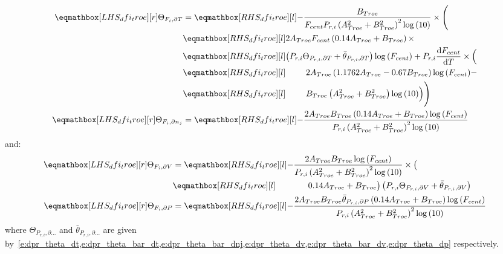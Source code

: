 \documentclass[12pt]{article}
\begin{document}
\begin{align}
\label{e:dfi_troe_dt_prod}
\lhs{dfi_troe}{\Theta_{F_i, \partial T}} &= 
\rhs{dfi_troe}{ - \frac{B_{Troe}}{F_{cent} P_{r, i} \left(A_{Troe}^{2} + B_{Troe}^{2}\right)^{2} \log{\left (10 \right )}} \times \Biggl(} \nonumber \\
&\rhs{dfi_troe}{ 2 A_{Troe} F_{cent} \left(0.14 A_{Troe} + B_{Troe}\right) \times } \nonumber \\
&\rhs{dfi_troe}{\left( P_{r, i} \Theta_{P_{r,i}, \partial T} + \bar{\theta}_{P_{r, i}, \partial T}\right) \log{\left (F_{cent} \right )} + P_{r, i} \frac{\text{d} F_{cent} }{\text{d} T } \times \Bigl(} \nonumber \\
&\rhs{dfi_troe}{\mathindent 2 A_{Troe} \left(1.1762 A_{Troe} - 0.67 B_{Troe}\right) \log{\left (F_{cent} \right )} - } \nonumber \\
&\rhs{dfi_troe}{\mathindent B_{Troe} \left(A_{Troe}^{2} + B_{Troe}^{2}\right) \log{\left (10 \right )}\Bigr)\Biggr)} \\
\label{e:dfi_troe_dnj_prod}
\lhs{dfi_troe}{\Theta_{F_i, \partial n_j}} &= \rhs{dfi_troe}{- \frac{2 A_{Troe} B_{Troe} \left(0.14 A_{Troe} + B_{Troe}\right) \log{\left (F_{cent} \right )}}{P_{r, i} \left(A_{Troe}^{2} + B_{Troe}^{2}\right)^{2} \log{\left (10 \right )}}}
\end{align}
and:
\begin{subequations}
 \label{e:dfi_troe_de_prod}
 \begin{align}
   \lhs{dfi_troe}{\Theta_{F_i, \partial V}} &= \rhs{dfi_troe}{- \frac{2 A_{Troe} B_{Troe} \log{\left (F_{cent} \right )}}{P_{r, i} \left(A_{Troe}^{2} + B_{Troe}^{2}\right)^{2} \log{\left (10 \right )}} \times \bigl(} \nonumber \\
					    & \rhs{dfi_troe}{\mathindent[alittlebit] 0.14 A_{Troe} + B_{Troe}\bigr) \left(P_{r, i} \Theta_{P_{r,i}, \partial V} + \bar{\theta}_{P_{r, i}, \partial V}\right)} \\
   \lhs{dfi_troe}{\Theta_{F_i, \partial P}} &= \rhs{dfi_troe}{- \frac{2 A_{Troe} B_{Troe} \bar{\theta}_{P_{r, i}, \partial P} \left(0.14 A_{Troe} + B_{Troe}\right) \log{\left (F_{cent} \right )}}{P_{r, i} \left(A_{Troe}^{2} + B_{Troe}^{2}\right)^{2} \log{\left (10 \right )}}}
 \end{align}
\end{subequations}
where $\Theta_{P_{r,i}, \partial \ldots}$ and $\bar{\theta}_{P_{r, i}, \partial \ldots}$ are given by~\cref{e:dpr_theta_dt,e:dpr_theta_bar_dt,e:dpr_theta_bar_dnj,e:dpr_theta_dv,e:dpr_theta_bar_dv,e:dpr_theta_dp} respectively.
\end{document}

